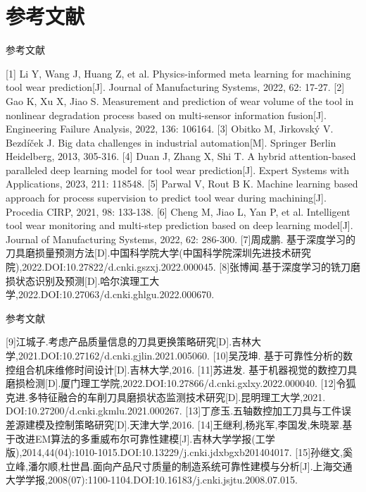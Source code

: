 \section{参考文献}
% 
\begin{frame}{参考文献}
\begin{thebibliography}{99}
\small
{}[1] Li Y, Wang J, Huang Z, et al. Physics-informed meta learning for machining tool wear prediction[J]. Journal of Manufacturing Systems, 2022, 62: 17-27.
[2] Gao K, Xu X, Jiao S. Measurement and prediction of wear volume of the tool in nonlinear degradation process based on multi-sensor information fusion[J]. Engineering Failure Analysis, 2022, 136: 106164.
[3] Obitko M, Jirkovský V. Bezdíček J. Big data challenges in industrial automation[M]. Springer Berlin Heidelberg, 2013, 305-316. 
[4] Duan J, Zhang X, Shi T. A hybrid attention-based paralleled deep learning model for tool wear prediction[J]. Expert Systems with Applications, 2023, 211: 118548.
[5] Parwal V, Rout B K. Machine learning based approach for process supervision to predict tool wear during machining[J]. Procedia CIRP, 2021, 98: 133-138.
[6] Cheng M, Jiao L, Yan P, et al. Intelligent tool wear monitoring and multi-step prediction based on deep learning model[J]. Journal of Manufacturing Systems, 2022, 62: 286-300.
[7]周成鹏. 基于深度学习的刀具磨损量预测方法[D].中国科学院大学(中国科学院深圳先进技术研究院),2022.DOI:10.27822/d.cnki.gszxj.2022.000045.
[8]张博闻.基于深度学习的铣刀磨损状态识别及预测[D].哈尔滨理工大学,2022.DOI:10.27063/d.cnki.ghlgu.2022.000670.
\end{thebibliography}
\end{frame}
% 
% 
\begin{frame}{参考文献}
\begin{thebibliography}{99}
\small
{}[9]江城子.考虑产品质量信息的刀具更换策略研究[D].吉林大学,2021.DOI:10.27162/d.cnki.gjlin.2021.005060.
[10]吴茂坤. 基于可靠性分析的数控组合机床维修时间设计[D].吉林大学,2016.
[11]苏进发. 基于机器视觉的数控刀具磨损检测[D].厦门理工学院,2022.DOI:10.27866/d.cnki.gxlxy.2022.000040.
[12]令狐克进.多特征融合的车削刀具磨损状态监测技术研究[D].昆明理工大学,2021. DOI:10.27200/d.cnki.gkmlu.2021.000267.
[13]丁彦玉.五轴数控加工刀具与工件误差源建模及控制策略研究[D].天津大学,2016.
[14]王继利,杨兆军,李国发,朱晓翠.基于改进EM算法的多重威布尔可靠性建模[J].吉林大学学报(工学版),2014,44(04):1010-1015.DOI:10.13229/j.cnki.jdxbgxb201404017.
[15]孙继文,奚立峰,潘尔顺,杜世昌.面向产品尺寸质量的制造系统可靠性建模与分析[J].上海交通大学学报,2008(07):1100-1104.DOI:10.16183/j.cnki.jsjtu.2008.07.015.
\end{thebibliography}
\end{frame}
% 